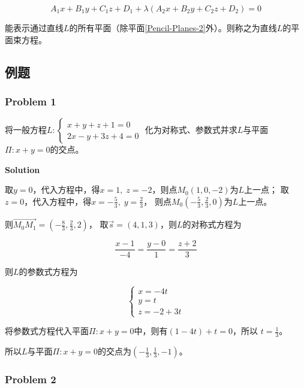 \documentclass[
	11pt, %
	a4paper, %
]{WhuSakuraBook}
\begin{document}
    \begin{equation}
        A_1 x+B_1 y+C_1 z+D_1+\lambda\left(A_2x+B_2y+C_2z+D_2\right) = 0
    \end{equation}

    能表示通过直线\(L\)的所有平面（除平面\ref{Pencil-Planes-2}外）。则称之为直线\(L\)的平面束方程。

\subsection{例题}

\subsubsection{Problem 1}

    将一般方程$L:\left\{\begin{array}{l}x+y+z+1=0 \\ 2 x-y+3z+4=0\end{array}\right.$
    化为对称式、参数式并求\(L\)与平面\(\Pi: x + y =0\)的交点。
    \vspace{1em}

    \textbf{Solution}
    \vspace{1em}

    取\(y = 0\)，代入方程中，得\(x=1,\; z=-2\)，则点\(M_{0}\left(1,0,-2\right)\)为\(L\)上一点；
    取\(z = 0\)，代入方程中，得\(x=-\frac{5}{3},\; y=\frac{2}{3}\)，
    则点\(M_{0}\left(-\frac{5}{3},\frac{2}{3},0\right)\)为\(L\)上一点。

    则\(\overrightarrow{M_{0}M_{1}} = \left(-\frac{8}{3},\frac{2}{3},2\right)\)，
    取\(\overrightarrow{s} = \left(4,1,3\right)\)，则\(L\)的对称式方程为

    \[
        \frac{x-1}{-4}=\frac{y-0}{1}=\frac{z+2}{3}
    \]

    则\(L\)的参数式方程为

    $$
        \left\{\begin{array}{l}
        x=-4 t \\
        y=t \\
        z=-2+3 t
        \end{array}\right.
    $$

    将参数式方程代入平面\(\Pi: x + y =0\)中，则有\(\left(1-4t\right) + t = 0\)，所以
    \(t = \frac{1}{3}\)。

    所以\(L\)与平面\(\Pi: x + y =0\)的交点为\(\left(-\frac{1}{3},\frac{1}{3},-1\right)\)。

\subsubsection{Problem 2}
\end{document}
